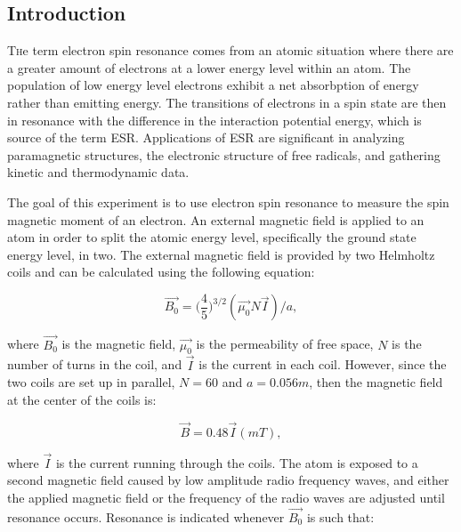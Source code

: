 \documentclass[twoside,10pt]{article}
\begin{document}
	\begin{multicols}{2} %
		
		\section{Introduction} 
		
		\lettrine[nindent=0em,lines=2]{T}he term electron spin resonance comes from an atomic situation where there are a greater amount of electrons at a lower energy level within an atom. The population of low energy level electrons exhibit a net absorbption of energy rather than emitting energy. The transitions of electrons in a spin state are then in resonance with the difference in the interaction potential energy, which is source of the term ESR. Applications of ESR are significant in analyzing paramagnetic structures, the electronic structure of free radicals, and gathering kinetic and thermodynamic data. 
		
		\indent The goal of this experiment is to use electron spin resonance to measure the spin magnetic moment of an electron. An external magnetic field is applied to an atom in order to split the atomic energy level, specifically the ground state energy level, in two. The external magnetic field is provided by two Helmholtz coils and can be calculated using the following equation:
		
		\begin{equation}
		\vec{B_0} =\bigg( \frac{4}{5}\bigg)^{3/2}(\vec{\mu_0} N \vec{I})/a, 
		\end{equation}
		
		 \noindent where $\vec{B_0}$ is the magnetic field, $\vec{\mu_0}$ is the permeability of free space, $N$ is the number of turns in the coil, and $\vec{I}$ is the current in each coil. However, since the two coils are set up in parallel, $N = 60$ and $a = 0.056m$, then the magnetic field at the center of the coils is:
			
		\begin{equation}
		\vec{B} =0.48 \vec{I} (m T),
		\end{equation}
		
		
		\noindent where $\vec{I}$ is the current running through the coils. The atom is exposed to a second magnetic field caused by low amplitude radio frequency waves, and either the applied magnetic field or the frequency of the radio waves are adjusted until resonance occurs. Resonance is indicated whenever $\vec{B_0}$ is such that:
		

\end{multicols}
\end{document}
